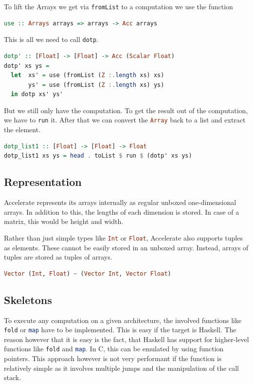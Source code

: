 \documentclass[a4paper,bibliography=totocnumbered,parskip,headsepline]{scrbook}
\begin{document}
To lift the Arrays we get via \lstinline[language=haskell]!fromList! to a computation we use the function
\begin{lstlisting}[language=haskell]
use :: Arrays arrays => arrays -> Acc arrays
\end{lstlisting}

This is all we need to call \lstinline[language=haskell]!dotp!.

\begin{lstlisting}[language=haskell]
dotp' :: [Float] -> [Float] -> Acc (Scalar Float)
dotp' xs ys =
  let  xs' = use (fromList (Z :.length xs) xs)
       ys' = use (fromList (Z :.length xs) ys)
  in dotp xs' ys'
\end{lstlisting}

But we still only have the computation.
To get the result out of the computation, we have to \lstinline[language=haskell]!run! it.
After that we can convert the \lstinline[language=haskell]!Array! back to a list and extract the element.

\begin{lstlisting}[language=haskell]
dotp_list1 :: [Float] -> [Float] -> Float
dotp_list1 xs ys = head . toList $ run $ (dotp' xs ys)
\end{lstlisting}

\subsection{Representation}
Accelerate represents its arrays internally as regular unboxed one-dimensional arrays.
In addition to this, the lengths of each dimension is stored.
In case of a matrix, this would be height and width.

Rather than just simple types like \lstinline[language=haskell]!Int! or \lstinline[language=haskell]!Float!, Accelerate also supports tuples as elements.
These cannot be easily stored in an unboxed array.
Instead, arrays of tuples are stored as tuples of arrays.

\begin{lstlisting}[language=haskell]
Vector (Int, Float) ~ (Vector Int, Vector Float)
\end{lstlisting}

\subsection{Skeletons}
To execute any computation on a given architecture, the involved functions like \lstinline[language=haskell,morekeywords={fold}]!fold! or \lstinline[language=haskell]!map! have to be implemented.
This is easy if the target is Haskell.
The reason however that it is easy is the fact, that Haskell has support for higher-level functions like \lstinline[language=haskell,morekeywords={fold}]!fold! and \lstinline[language=haskell]!map!.
In C, this can be emulated by using function pointers.
This approach however is not very performant if the function is relatively simple as it involves multiple jumps and the manipulation of the call stack.
\end{document}

